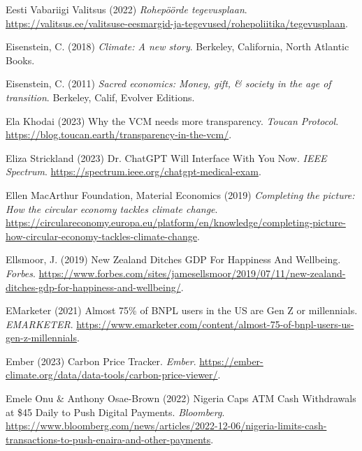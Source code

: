 \documentclass[
  letterpaper,
  DIV=11,
  numbers=noendperiod]{scrartcl}
\newlength{\cslhangindent}
\newenvironment{CSLReferences}[2] %
 {\begin{list}{}{%
  \setlength{\itemindent}{0pt}
  \setlength{\leftmargin}{0pt}
  \setlength{\parsep}{0pt}
  \ifodd #1
   \setlength{\leftmargin}{\cslhangindent}
   \setlength{\itemindent}{-1\cslhangindent}
  \fi
  \setlength{\itemsep}{#2\baselineskip}}}
 {\end{list}}
\begin{document}
\begin{CSLReferences}{0}{1}
Eesti Vabariigi Valitsus (2022) \emph{Rohep{ö}{ö}rde tegevusplaan}.
\url{https://valitsus.ee/valitsuse-eesmargid-ja-tegevused/rohepoliitika/tegevusplaan}.

Eisenstein, C. (2018) \emph{Climate: A new story}. Berkeley, California,
North Atlantic Books.

Eisenstein, C. (2011) \emph{Sacred economics: Money, gift, \& society in
the age of transition}. Berkeley, Calif, Evolver Editions.

Ela Khodai (2023) Why the {VCM} needs more transparency. \emph{Toucan
Protocol}. \url{https://blog.toucan.earth/transparency-in-the-vcm/}.

Eliza Strickland (2023) Dr. {ChatGPT Will Interface With You Now}.
\emph{IEEE Spectrum}.
\url{https://spectrum.ieee.org/chatgpt-medical-exam}.

Ellen MacArthur Foundation, Material Economics (2019) \emph{Completing
the picture: {How} the circular economy tackles climate change}.
\url{https://circulareconomy.europa.eu/platform/en/knowledge/completing-picture-how-circular-economy-tackles-climate-change}.

Ellsmoor, J. (2019) New {Zealand Ditches GDP For Happiness And
Wellbeing}. \emph{Forbes}.
\url{https://www.forbes.com/sites/jamesellsmoor/2019/07/11/new-zealand-ditches-gdp-for-happiness-and-wellbeing/}.

EMarketer (2021) Almost 75\% of {BNPL} users in the {US} are {Gen Z} or
millennials. \emph{EMARKETER}.
\url{https://www.emarketer.com/content/almost-75-of-bnpl-users-us-gen-z-millennials}.

Ember (2023) Carbon {Price Tracker}. \emph{Ember}.
\url{https://ember-climate.org/data/data-tools/carbon-price-viewer/}.

Emele Onu \& Anthony Osae-Brown (2022) Nigeria {Caps ATM Cash
Withdrawals} at \$45 {Daily} to {Push Digital Payments}.
\emph{Bloomberg}.
\url{https://www.bloomberg.com/news/articles/2022-12-06/nigeria-limits-cash-transactions-to-push-enaira-and-other-payments}.


\end{CSLReferences}
\end{document}
